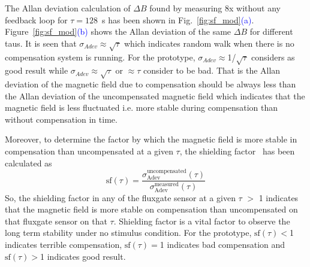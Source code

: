 The Allan deviation calculation of $\Delta B$ found by measuring 8x without any feedback loop for $\tau=128$~s has been shown in Fig.~\ref{fig:sf_mod}\textcolor{blue}{(a)}. Figure~\ref{fig:sf_mod}\textcolor{blue}{(b)} shows the Allan deviation of the same $\Delta B$ for different taus.  It is seen that $\sigma_{Adev}\approx \sqrt{\tau}$ which indicates random walk when there is no compensation system is running. For the prototype, $\sigma_{Adev}\approx$1/$\sqrt{\tau}$ considers as good result while $\sigma_{Adev}\approx \sqrt{\tau}$ or $\approx \tau$ consider to be bad. That is the Allan deviation of the magnetic field due to compensation should be always less than the Allan deviation of the uncompensated magnetic field which indicates that the magnetic field is less fluctuated i.e. more stable during compensation than without compensation in time. 



Moreover, to determine the factor by which the magnetic field is more stable in compensation than uncompensated at a given $\tau$, the shielding factor~\cite{bea} has been calculated as
\begin{equation}\label{eq:sf}
    \text{sf} (\tau)=\frac{\sigma_{\text{Adev}}^{\text{uncompensated}}(\tau)}{\sigma_{\text{Adev}}^{\text{measured}}(\tau)}
\end{equation}
So, the shielding factor in any of the fluxgate sensor at a given $\tau$  $>$ 1 indicates that the magnetic field is more stable on compensation than uncompensated on that fluxgate sensor on that $\tau$. Shielding factor is a vital factor to observe the long term stability under no stimulus condition. For the prototype, $\text{sf} (\tau)<$1 indicates terrible compensation, $\text{sf} (\tau)=$1 indicates bad compensation and $\text{sf} (\tau)>$1 indicates good result.
 

 
 
 
